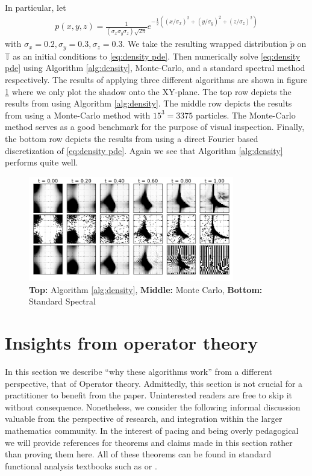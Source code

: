 \documentclass[12pt]{amsart}
\begin{document}
In particular, let
\begin{align}
	p(x,y,z) = \frac{1}{ (\sigma_{x} \sigma_{y} \sigma_{z} )\sqrt{ 2\pi } } e^{ - \frac{1}{2} ( (x/\sigma_{x})^{2} + (y/\sigma_{y})^{2} +  (z/\sigma_{z})^{2} )}
\end{align}
with $\sigma_{x} = 0.2, \sigma_{y} = 0.3, \sigma_{z} = 0.3$.
We take the resulting wrapped distribution $\tilde{p}$ on $\mathbb{T}$ as an initial conditions to \eqref{eq:density pde}.
Then numerically solve \eqref{eq:density pde} using Algorithm \ref{alg:density}, Monte-Carlo, and a standard spectral method respectively.
The results of applying three different algorithms are shown in figure \ref{fig:ABCD} where we only plot the shadow onto the XY-plane.
The top row depicts the results from using Algorithm \ref{alg:density}.
The middle row depicts the results from using a Monte-Carlo method with $15^{3} = 3375$ particles.
The Monte-Carlo method serves as a good benchmark for the purpose of visual inspection.
Finally, the bottom row depicts the results from using a direct Fourier based discretization of \eqref{eq:density pde}.
Again we see that Algorithm \ref{alg:density} performs quite well.


\begin{figure}
	\centering
	\includegraphics[width=0.8\textwidth]{./images/ABCD_flow.png}
	\caption{ \tiny {\bf Top:} Algorithm \ref{alg:density}, {\bf Middle:} Monte Carlo, {\bf Bottom:} Standard Spectral}
	\label{fig:ABCD}
\end{figure}


\section{Insights from operator theory}

In this section we describe ``why these algorithms work'' from a different perspective, that of Operator theory.
Admittedly, this section is not crucial for a practitioner to benefit from the paper.
Uninterested readers are free to skip it without consequence.
Nonetheless, we consider the following informal discussion valuable from the perspective of research, and integration within the larger mathematics community.
In the interest of pacing and being overly pedagogical we will provide references for theorems and claims made in this section rather than proving them here.
All of these theorems can be found in standard functional analysis textbooks such as \cite{Conway1990} or \cite{Rudin1991}.
\end{document}
